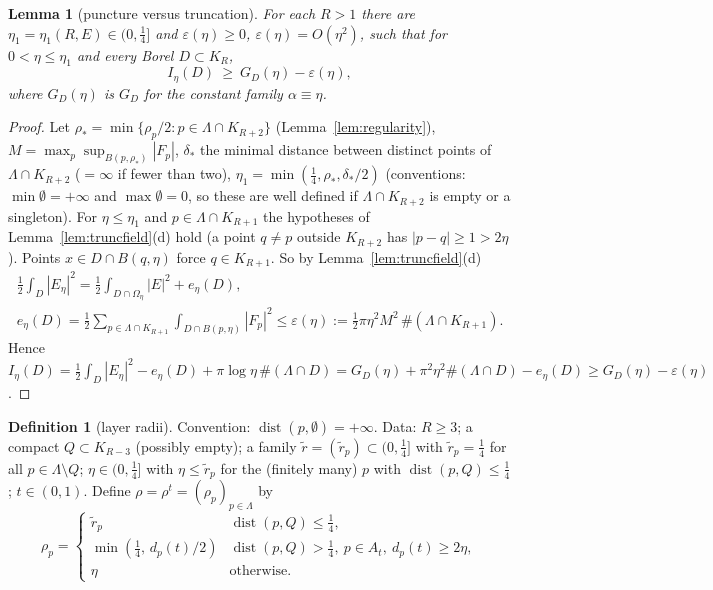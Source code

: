 \documentclass[11pt]{article}
\newtheorem{lemma}[theorem]{Lemma}
\theoremstyle{definition}
\newtheorem{definition}[theorem]{Definition}
\theoremstyle{remark}
\newcommand{\Lam}{\Lambda}
\DeclareMathOperator{\dist}{dist}
\begin{document}
\begin{lemma}[puncture versus truncation]\label{lem:punct-trunc}
For each $R>1$ there are $\eta_1=\eta_1(R,E)\in(0,\frac14]$ and $\varepsilon(\eta)\ge0$, $\varepsilon(\eta)=O(\eta^2)$, such that for $0<\eta\le\eta_1$ and every Borel $D\subset K_R$,
\[
I_\eta(D)\ \ge\ G_D(\eta)-\varepsilon(\eta),
\]
where $G_D(\eta)$ is $G_D$ for the constant family $\alpha\equiv\eta$.
\end{lemma}
\begin{proof}
Let $\rho_*=\min\{\rho_p/2:p\in\Lam\cap K_{R+2}\}$ (Lemma~\ref{lem:regularity}), $M=\max_p\sup_{B(p,\rho_*)}|F_p|$, $\delta_*$ the minimal distance
between distinct points of $\Lam\cap K_{R+2}$ ($=\infty$ if fewer than two), $\eta_1=\min(\frac14,\rho_*,\delta_*/2)$ (conventions: $\min\emptyset=+\infty$ and $\max\emptyset=0$, so these are well defined if $\Lam\cap K_{R+2}$ is empty or a singleton).  For $\eta\le\eta_1$ and $p\in\Lam\cap K_{R+1}$ the hypotheses of
Lemma~\ref{lem:truncfield}(d) hold (a point $q\ne p$ outside $K_{R+2}$ has $|p-q|\ge1>2\eta$).  Points $x\in D\cap B(q,\eta)$ force $q\in K_{R+1}$.  So by
Lemma~\ref{lem:truncfield}(d)
\begin{gather*}
\tfrac12\int_D|E_\eta|^2=\tfrac12\int_{D\cap\Omega_\eta}|E|^2+e_\eta(D),\\
e_\eta(D)=\tfrac12\sum_{p\in\Lam\cap K_{R+1}}\int_{D\cap B(p,\eta)}|F_p|^2\le\varepsilon(\eta):=\tfrac12\pi\eta^2M^2\,\#(\Lam\cap K_{R+1}).
\end{gather*}
Hence $I_\eta(D)=\frac12\int_D|E_\eta|^2-e_\eta(D)+\pi\log\eta\,\#(\Lam\cap D)=G_D(\eta)+\pi^2\eta^2\#(\Lam\cap D)-e_\eta(D)\ge G_D(\eta)-\varepsilon(\eta)$.
\end{proof}

\begin{definition}[layer radii]\label{def:layerradii}
Convention: $\dist(p,\emptyset)=+\infty$.  Data: $R\ge3$; a compact $Q\subset K_{R-3}$ (possibly empty); a family $\tilde r=(\tilde r_p)\subset(0,\frac14]$ with $\tilde r_p=\frac14$ for all $p\in\Lam\setminus Q$; $\eta\in(0,\frac14]$ with $\eta\le\tilde r_p$ for the (finitely many) $p$ with $\dist(p,Q)\le\frac14$;
$t\in(0,1)$.  Define $\rho=\rho^t=(\rho_p)_{p\in\Lam}$ by
\[
\rho_p=\begin{cases}\tilde r_p&\dist(p,Q)\le\frac14,\\
\min(\frac14,\,d_p(t)/2)&\dist(p,Q)>\frac14,\ p\in A_t,\ d_p(t)\ge2\eta,\\
\eta&\text{otherwise.}\end{cases}
\]
\end{definition}
\end{document}
